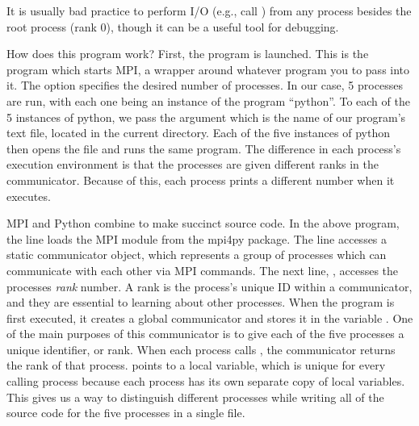 \begin{warn}
It is usually bad practice to perform I/O (e.g., call ) from any process besides the root process (rank $0$), though it can be a useful tool for debugging.
\end{warn}

How does this program work?
First, the  program is launched.
This is the program which starts MPI, a wrapper around whatever program you to pass into it.
The  option specifies the desired number of processes.
In our case, 5 processes are run, with each one being an instance of the program ``python''.
To each of the 5 instances of python, we pass the argument  which is the name of our program's text file, located in the current directory.
Each of the five instances of python then opens the  file and runs the same program.
The difference in each process's execution environment is that the processes are given different ranks in the communicator.
Because of this, each process prints a different number when it executes.

MPI and Python combine to make succinct source code.
In the above program, the line  loads the MPI module from the mpi4py package.
The line  accesses a static communicator object, which represents a group of processes which can communicate with each other via MPI commands.
The next line, , accesses the processes \emph{rank} number.
A rank is the process's unique ID within a communicator, and they are essential to learning about other processes.
When the program  is first executed, it creates a global communicator and stores it in the variable .
One of the main purposes of this communicator is to give each of the five processes a unique identifier, or rank.
When each process calls , the communicator returns the rank of that process.
 points to a local variable, which is unique for every calling process because each process has its own separate copy of local variables.
This gives us a way to distinguish different processes while writing all of the source code for the five processes in a single file.


